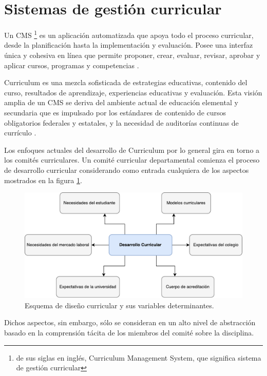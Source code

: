 \section{Sistemas de gestión curricular}
Un CMS \footnote{de sus siglas en inglés, Curriculum Management System, que significa sistema de gestión curricular} es un aplicación automatizada que apoya todo el proceso curricular, desde la planificación hasta la implementación y evaluación. Posee una interfaz única y cohesiva en línea que permite proponer, crear, evaluar, revisar, aprobar y aplicar cursos, programas y competencias \citep{harden2001amee}.

Curriculum es una mezcla sofisticada de estrategias educativas, contenido del curso, resultados de aprendizaje, experiencias educativas y evaluación. Esta visión amplia de un CMS se deriva del ambiente actual de educación elemental y secundaria que es impulsado por los estándares de contenido de cursos obligatorios federales y estatales, y la necesidad de auditorías continuas de currículo \citep{west2000technology}.

Los enfoques actuales del desarrollo de Curriculum por lo general gira en torno a los comités curriculares. Un comité curricular departamental comienza el proceso de desarrollo curricular considerando como entrada cualquiera de los aspectos mostrados en la figura \ref{diseno_curricular}.

\begin{figure}[H]
\centering
\includegraphics[width=125mm,scale=1]{Figuras/diseno_curricular}
\caption{Esquema de diseño curricular y sus variables determinantes.}
  \label{diseno_curricular}
\end{figure}

Dichos aspectos, sin embargo, sólo se consideran en un alto nivel de abstracción basado en la comprensión tácita de los miembros del comité sobre la disciplina.